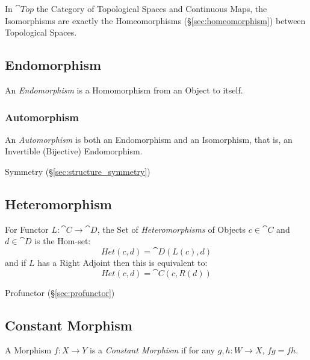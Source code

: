 In $\cat{Top}$ the Category of Topological Spaces and Continuous
Maps, the Isomorphisms are exactly the Homeomorphisms
(\S\ref{sec:homeomorphism}) between Topological Spaces.



\subsection{Endomorphism}\label{sec:endomorphism}

An \emph{Endomorphism} is a Homomorphism from an Object to itself.



\subsubsection{Automorphism}\label{sec:automorphism}

An \emph{Automorphism} is both an Endomorphism and an Isomorphism,
that is, an Invertible (Bijective) Endomorphism.

Symmetry (\S\ref{sec:structure_symmetry})



\subsection{Heteromorphism}\label{sec:heteromorphism}

For Functor $L : \cat{C} \rightarrow \cat{D}$, the Set of
\emph{Heteromorphisms} of Objects $c \in \cat{C}$ and $d \in
\cat{D}$ is the Hom-set:
\[
  Het(c,d) = \cat{D}(L(c), d)
\]
and if $L$ has a Right Adjoint then this is equivalent to:
\[
  Het(c,d) = \cat{C}(c, R(d))
\]

Profunctor (\S\ref{sec:profunctor})



\subsection{Constant Morphism}\label{sec:constant_morphism}

A Morphism $f : X \rightarrow Y$ is a \emph{Constant Morphism} if for
any $g, h : W \rightarrow X$, $fg = fh$.

